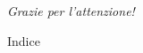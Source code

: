 \documentclass[italian, aspectratio=169,bookmarks=false]{beamer}
\makeatletter
\newcommand{\0}{\setminus\{0\}} %
\theoremstyle{definition}
\theoremstyle{plain}
\def\beamer@writeslidentry@miniframesoff{%
  \expandafter\beamer@ifempty\expandafter{\beamer@framestartpage}{}%
  {%
    \clearpage\beamer@notesactions%
  }
}
\newcommand*{\miniframesoff}{\let\beamer@writeslidentry=\beamer@writeslidentry@miniframesoff}
\makeatother
\begin{document}
\miniframesoff
\subsection*{}
\begin{frame}
    \begin{center}
    \LARGE{\slshape{Grazie per l'attenzione!}}
    \end{center}
\end{frame}

\begin{frame}{Indice}
    \tableofcontents
\end{frame}

\end{document}
